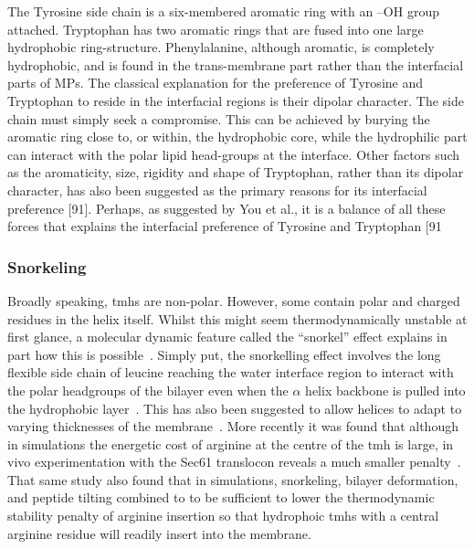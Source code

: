 The Tyrosine side chain is a six-membered aromatic ring with an –OH group attached.
Tryptophan has two aromatic rings that are fused into one large hydrophobic ring-structure.
Phenylalanine, although aromatic, is completely hydrophobic, and is found in the trans-membrane part rather than the interfacial parts of MPs.
The classical explanation for the preference of Tyrosine and Tryptophan to reside in the interfacial regions is their dipolar character.
The side chain must simply seek a compromise.
This can be achieved by burying the aromatic ring close to, or within, the hydrophobic core, while the hydrophilic part can interact with the polar lipid head-groups at the interface.
Other factors such as the aromaticity, size, rigidity and shape of Tryptophan, rather than its dipolar character, has also been suggested as the primary reasons for its interfacial preference [91].
Perhaps, as suggested by You et al., it is a balance of all these forces that explains the interfacial preference of Tyrosine and Tryptophan [91

\subsubsection{Snorkeling}

Broadly speaking, \gls{tmh}s are non-polar.
However, some contain polar and charged residues in the helix itself.
Whilst this might seem thermodynamically unstable at first glance, a molecular dynamic feature called the ``snorkel'' effect explains in part how this is possible~\cite{Chamberlain2004, Strandberg2003}.
Simply put, the snorkelling effect involves the long flexible side chain of leucine reaching the water interface region to interact with the polar headgroups of the bilayer even when the $\alpha$ helix backbone is pulled into the hydrophobic layer~\cite{Krishnakumar2007}.
This has also been suggested to allow helices to adapt to varying thicknesses of the membrane~\cite{Kandasamy2006}.
More recently it was found that although in simulations the energetic cost of arginine at the centre of the \gls{tmh} is large, in vivo experimentation with the Sec61 translocon reveals a much smaller penalty~\cite{Ulmschneider2017}.
That same study also found that in simulations, snorkeling, bilayer deformation, and peptide tilting combined to to be sufficient to lower the thermodynamic stability penalty of arginine insertion so that hydrophoic \gls{tmh}s with a central arginine residue will readily insert into the membrane.


